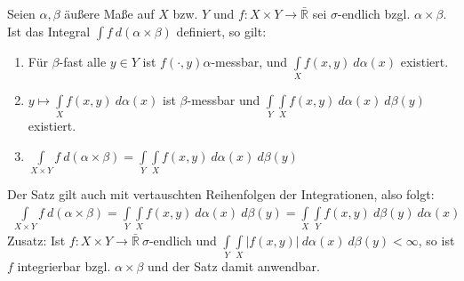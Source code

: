   \begin{theorem}[Fubini]
    Seien $\alpha, \beta$ äußere Maße auf $X$ bzw. $Y$ und $f: X \times Y \to \bar{\mathbb{R}}$ sei $\sigma$-endlich bzgl. $\alpha \times \beta$. Ist das Integral $\int f \ d(\alpha \times \beta)$ definiert, so gilt:
    \begin{enumerate}
      \item Für $\beta$-fast alle $y \in Y$ ist $f(\cdot, y) \alpha$-messbar, und $\int\limits_X f(x,y) \ d \alpha(x)$ existiert.
      \item $y \mapsto \int\limits_X f(x,y) \ d\alpha(x)$ ist $\beta$-messbar und $\int\limits_Y \int\limits_X f(x,y) \ d\alpha(x) \ d\beta(y)$ existiert.
      \item $\int\limits_{X\times Y} f \ d(\alpha \times \beta) = \int\limits_Y \int\limits_X f(x,y) \ d\alpha(x) \ d\beta(y)$
    \end{enumerate}
    Der Satz gilt auch mit vertauschten Reihenfolgen der Integrationen, also folgt:
    \begin{align*}
      \int\limits_{X\times Y} f \ d(\alpha \times \beta) = \int\limits_Y \int\limits_X f(x,y) \ d\alpha(x) \ d\beta(y) = \int\limits_X \int\limits_Y f(x,y) \ d\beta(y) \ d\alpha(x)
    \end{align*}
    Zusatz: Ist $f: X \times Y \to \bar{\mathbb{R}} \ \sigma$-endlich und $\int\limits_Y \int\limits_X |f(x,y)| \ d\alpha(x) \ d\beta(y) < \infty$, so ist $f$ integrierbar bzgl. $\alpha \times \beta$ und der Satz damit anwendbar.
  \end{theorem}

